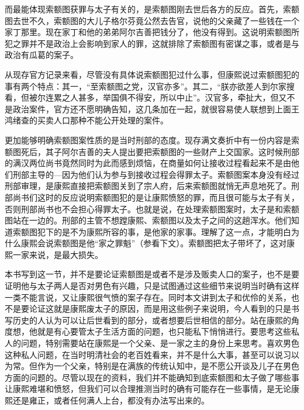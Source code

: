 
而最能体现索额图获罪与太子有关的，是索额图刚去世后各方的反应。首先，索额图去世不久，索额图的大儿子格尔芬竟公然去告官，说他的父亲藏了一些钱在一个家丁那里。现在家丁和他的弟弟阿尔吉善把钱分了，他没有得到。这说明索额图所犯之罪并不是政治上会影响到家人的罪，这就排除了索额图有密谋之事，或者是与政治有瓜葛的案子。



从现存官方记录来看，尽管没有具体说索额图犯过什么事，但康熙说过索额图犯的事有两个特点：其一，“至索额图之党，汉官亦多”。其二，“朕亦欲差人到尔家搜看，但被尔连累之人甚多，举国俱不得安，所以中止”。汉官多，牵扯大，但又不是政治案件，官方还不愿明确告知，这几条加在一起，就很容易使人联想到上面王鸿绪查的买卖人口那种不能公开处理的案件。



更加能够明确索额图案性质的是当时刑部的态度。现存满文奏折中有一份内容是索额图死后，其子阿尔吉善的夫人提出要把索额图的一些财产上交国家。这时候刑部的满汉两位尚书竟然同时为此而感到烦恼，在商量如何让接收过程看起来不是由他们刑部主导的—因为他们认为参与到接收过程会得罪太子。索额图案本身没有经过刑部审理，是康熙直接把索额图关到了宗人府，后来索额图就悄无声息地死了。刑部尚书们这时的反应说明索额图犯的是让康熙愤怒的罪，而且很可能与太子有关，否则刑部尚书也不会担心得罪太子。也就是说，在处理索额图案时，太子是和索额图站在一边的。刑部的主管不想蹚康熙、索额图以及太子之间的这趟浑水。他们知道索额图犯下的是不为康熙所容的事，是他家的家事。理解了这一点，才能明白为什么康熙会说索额图是他“家之罪魁”（参看下文）。索额图把太子带坏了，这对康熙一家来说，是最大损失。



本书写到这一节，并不是要论证索额图是或者不是涉及贩卖人口的案子，也不是要证明他与太子两人是否对男色有兴趣，只是试图通过这些细节来说明当时确有这样一类不能言说，又让康熙很气愤的案子存在。同时本文讲到太子和优伶的关系，也不是要论证这就是康熙废太子的原因，而是用这些例子来说明，今人看到的只是书写历史的人认为可以让后世看到的部分，或者想要后世相信的部分。站在康熙的角度想，他就是有心要管太子生活方面的问题，也只能私下悄悄进行。要思考这些私人的问题，特别需要站在康熙是一个父亲、是一家之主的身份上来思考。喜欢男色这种私人问题，在当时明清社会的老百姓看来，并不是什么大事，甚至可以说习以为常。但作为一个父亲，特别是在满族的传统认知中，是不愿公开谈及儿子在男色方面的问题的。尽管以现在的资料，我们并不能确知到底索额图和太子做了哪些事让康熙难堪和愤怒，但我们可以合理推测当时的确有可能存在一些事情，是无论康熙还是雍正，或者任何满人上台，都没有办法写出来的。


